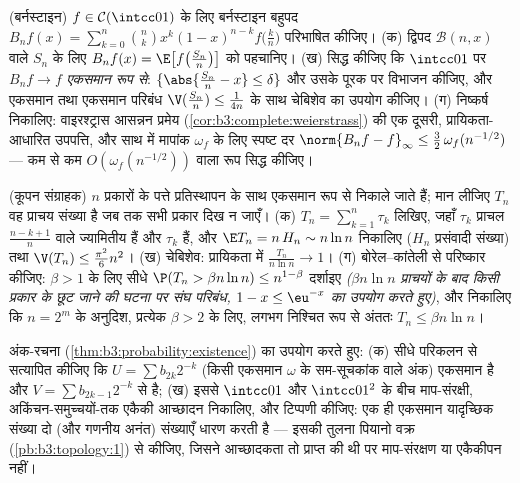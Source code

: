 \begin{exercise}[$\star\star\star$]\label{exo:b3:probability:8}
(बर्नस्टाइन) $f \in \mathcal C(\intcc01)$ के लिए बर्नस्टाइन बहुपद $B_nf(x) =
\sum_{k=0}^n\binom nkx^k(1-x)^{n-k}f\bigl(\frac kn\bigr)$ परिभाषित कीजिए।
(क) द्विपद $\mathcal B(n, x)$ वाले $S_n$ के लिए $B_nf(x) = \E\bigl[f\bigl(\frac
{S_n}n\bigr)\bigr]$ को पहचानिए।
(ख) सिद्ध कीजिए कि $\intcc01$ पर $B_nf \to f$ \emph{एकसमान रूप से}: $\{\abs{\frac{S_n}n - x} \leq \delta\}$ और
उसके पूरक पर विभाजन कीजिए, और एकसमान  तथा एकसमान परिबंध
$\V(\frac{S_n}n) \leq \frac1{4n}$ के साथ चेबिशेव का उपयोग कीजिए।
(ग) निष्कर्ष निकालिए: वाइरश्ट्रास आसन्नन प्रमेय (\cref{cor:b3:complete:weierstrass}) की एक
दूसरी, प्रायिकता-आधारित उपपत्ति, और साथ में  मापांक $\omega_f$
के लिए स्पष्ट दर
$\norm{B_nf - f}_\infty \leq \frac32\,\omega_f(n^{-1/2})$
--- कम से कम $O(\omega_f(n^{-1/2}))$ वाला रूप सिद्ध कीजिए।
\end{exercise}

\begin{exercise}[$\star\star\star$]\label{exo:b3:probability:9}
(कूपन संग्राहक) $n$ प्रकारों के पत्ते प्रतिस्थापन के साथ एकसमान
रूप से निकाले जाते हैं; मान लीजिए $T_n$ वह प्राचय संख्या है जब तक
सभी प्रकार दिख न जाएँ।
(क) $T_n = \sum_{k=1}^{n}\tau_k$ लिखिए, जहाँ $\tau_k$ प्राचल $\frac{n - k + 1}n$ वाले ज्यामितीय हैं और
$\tau_k$  हैं, और $\E T_n = n\,H_n \sim n\ln n$ निकालिए ($H_n$ प्रसंवादी संख्या) तथा
$\V(T_n) \leq
\frac{\pi^2}6n^2$।
(ख) चेबिशेव: प्रायिकता में $\frac{T_n}{n\ln n} \to 1$।
(ग) बोरेल--कांतेली से परिष्कार कीजिए: $\beta > 1$ के लिए सीधे $\P(T_n >
\beta n\ln n) \leq n^{1 - \beta}$
दर्शाइए \emph{($\beta n\ln n$ प्राचयों के बाद किसी प्रकार के छूट जाने की घटना
पर संघ परिबंध, $1 - x \leq \eu^{-x}$ का उपयोग करते हुए)}, और निकालिए कि $n = 2^m$ के
अनुदिश, प्रत्येक $\beta > 2$ के लिए, लगभग निश्चित रूप से अंततः $T_n \leq \beta n\ln
n$।
\end{exercise}

\begin{exercise}[$\star\star$]\label{exo:b3:probability:10}
अंक-रचना (\cref{thm:b3:probability:existence}) का उपयोग करते हुए:
(क) सीधे परिकलन से सत्यापित कीजिए कि $U = \sum b_{2k}2^{-k}$ (किसी एकसमान $\omega$ के
सम-सूचकांक वाले अंक) एकसमान है और $V = \sum b_{2k-1}2^{-k}$ से  है;
(ख) इससे $\intcc01$ और $\intcc01^2$ के बीच माप-संरक्षी, अकिंचन-समुच्चयों-तक
 एकैकी आच्छादन निकालिए, और टिप्पणी कीजिए: एक ही एकसमान
यादृच्छिक संख्या दो (और गणनीय अनंत)  संख्याएँ धारण करती है
--- इसकी तुलना पियानो वक्र (\cref{pb:b3:topology:1}) से कीजिए, जिसने आच्छादकता तो
प्राप्त की थी पर माप-संरक्षण या एकैकीपन नहीं।
\end{exercise}

